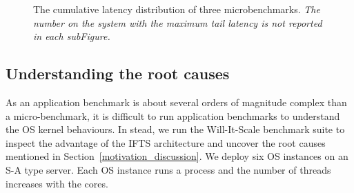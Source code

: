 \documentclass[pageno]{jpaper}
\begin{document}
\begin{figure}[t]
\setlength{\abovecaptionskip}{0pt}
\setlength{\belowcaptionskip}{0pt}
\centering
    \caption{The cumulative latency distribution of three microbenchmarks. \emph{The number on the system with the maximum tail latency is not reported in each subFigure.}}
    \label{fig_rootcause_microbenchmarks_cdf}
\end{figure}

\subsection{Understanding the root causes}\label{hit_root_cause}

As an application benchmark is about several
orders of magnitude complex than a micro-benchmark, it is difficult to run application benchmarks to understand the OS kernel behaviours. In stead, we run the Will-It-Scale benchmark suite to inspect the advantage of the IFTS architecture and uncover the root causes mentioned in Section~\ref{motivation_discussion}. We deploy six OS instances on an S-A type server. Each OS instance runs a process and the number of threads increases with the cores. 
\end{document}
